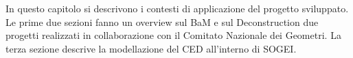 In questo capitolo si descrivono i contesti di applicazione del progetto sviluppato.
Le prime due sezioni fanno un overview sul BaM e sul Deconstruction due progetti
realizzati in collaborazione con il Comitato Nazionale dei Geometri.
La terza sezione descrive la modellazione del CED all'interno di SOGEI.

